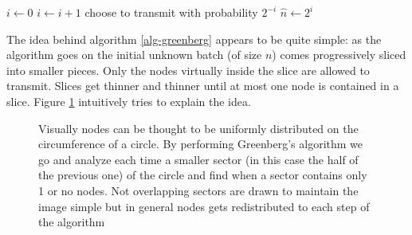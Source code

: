 \documentclass[12pt,a4paper]{report}
\newcommand{\algname}[1]{\ensuremath{\mbox{\sc #1}}}
\begin{document}
\begin{algorithm}[H]
\begin{algorithmic}
\STATE $i\gets 0$
\REPEAT
	\STATE $i\gets i+1$
	\STATE choose to transmit with probability $2^{-i}$
\STATE $\hat{n} \gets 2^{i}$
\end{algorithmic}
\caption{\algname{Basic Greenberg}}
\label{alg-greenberg}
\end{algorithm}

The idea behind algorithm \ref{alg-greenberg} appears to be quite simple: as the algorithm goes on the initial unknown batch (of size $n$) comes progressively sliced into smaller pieces. Only the nodes virtually inside the slice are allowed to transmit. Slices get thinner and thinner until at most one node is contained in a slice. Figure \ref{fig:greeberg-split} intuitively tries to explain the idea.\\ 

\begin{figure}[htb!]
    \centering
    \caption[\emph{Basic Greenberg}: batch split idea]{Visually nodes can be thought to be uniformly distributed on the circumference of a circle. By performing Greenberg's algorithm we go and analyze each time a smaller sector (in this case the half of the previous one) of the circle and find when a sector contains only 1 or no nodes.  Not overlapping sectors are drawn to maintain the image simple but in general nodes gets redistributed to each step of the algorithm}
    \label{fig:greeberg-split}
\end{figure}
\end{document}
